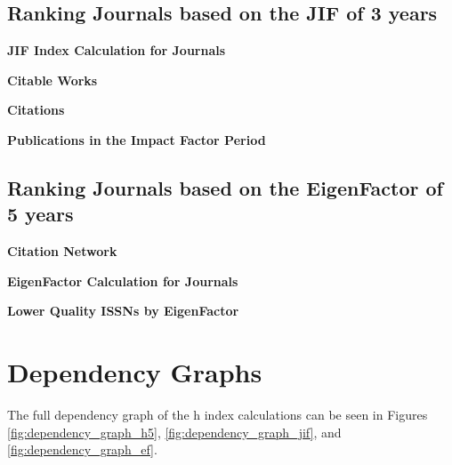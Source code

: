\subsection{Ranking Journals based on the JIF of 3 years}

\textbf{JIF Index Calculation for Journals}





\textbf{Citable Works}





\textbf{Citations}





\textbf{Publications in the Impact Factor Period}




\subsection{Ranking Journals based on the EigenFactor of 5 years}

\textbf{Citation Network}



\textbf{EigenFactor Calculation for Journals}



\textbf{Lower Quality ISSNs by EigenFactor}





\section{Dependency Graphs}
The full dependency graph of the h index calculations can be seen
in Figures \ref{fig:dependency_graph_h5}, \ref{fig:dependency_graph_jif},
and \ref{fig:dependency_graph_ef}.

